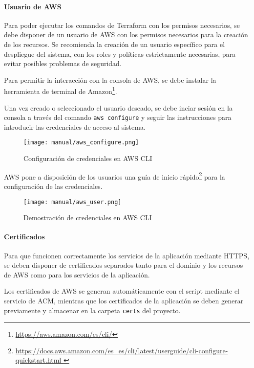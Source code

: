 \newpage{}
\paragraph{Usuario de AWS}
Para poder ejecutar los comandos de Terraform con los permisos necesarios, se
debe disponer de un usuario de AWS con los permisos necesarios para la creación
de los recursos. Se recomienda la creación de un usuario específico para el
despliegue del sistema, con los roles y políticas estrictamente necesarias, para
evitar posibles problemas de seguridad.

Para permitir la interacción con la consola de AWS, se debe instalar la
herramienta de terminal de Amazon\footnote{\url{https://aws.amazon.com/es/cli/}}.

Una vez creado o seleccionado el usuario deseado, se debe inciar sesión en la
consola a través del comando \texttt{aws configure} y seguir las instrucciones
para introducir las credenciales de acceso al sistema.

\begin{figure}[H]
	\centering
	\texttt{[image: manual/aws\_configure.png]}
	\caption{Configuración de credenciales en AWS CLI}
	\label{fig:aws_configure}
\end{figure}

AWS pone a disposición de los usuarios una guía de inicio rápido\footnote{\url{
	https://docs.aws.amazon.com/es_es/cli/latest/userguide/cli-configure-quickstart.html
}} para la configuración de las credenciales.

\begin{figure}[H]
	\centering
	\texttt{[image: manual/aws\_user.png]}
	\caption{Demostración de credenciales en AWS CLI}
	\label{fig:aws_user}
\end{figure}


\newpage{}
\paragraph{Certificados}
Para que funcionen correctamente los servicios de la aplicación mediante HTTPS,
se deben disponer de certificados separados tanto para el dominio y los
recursos de AWS como para los servicios de la aplicación.

Los certificados de AWS se generan automáticamente con el script mediante el
servicio de ACM, mientras que los certificados de la aplicación se deben
generar previamente y almacenar en la carpeta \texttt{certs} del proyecto.

